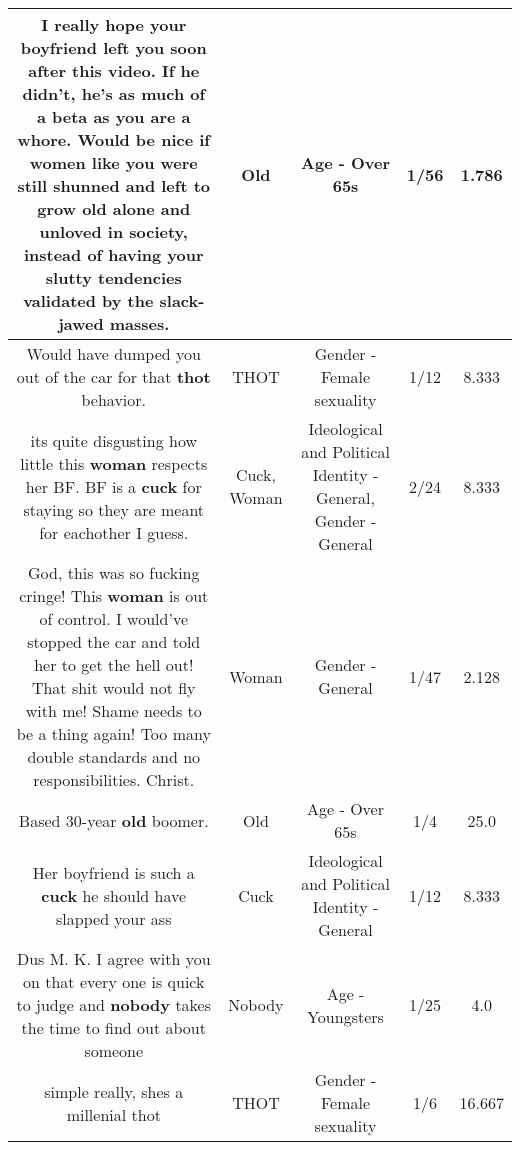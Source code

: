 \documentclass[11pt]{article}
\newlength\mylength
\begin{document}
\begin{center}
\begin{longtable}{|C{.65\mylength}|C{.30\mylength}|C{.12\mylength}|C{.12\mylength}|C{.12\mylength}|}
  \small I really hope your boyfriend left you soon after this video.  If he didn't, he's as much of a beta as you are a whore.  Would be nice if women like you were still shunned and left to grow \textbf{old} alone and unloved in society, instead of having your slutty tendencies validated by the slack-jawed masses.\normalsize   & Old & Age - Over 65s & 1/56 & 1.786 \\  \hline
  \small Would have dumped you out of the car for that \textbf{thot} behavior.\normalsize   & THOT & Gender - Female sexuality & 1/12 & 8.333 \\  \hline
  \small its quite disgusting how little this \textbf{woman} respects her BF. BF is a \textbf{cuck} for staying so they are meant for eachother I guess.\normalsize   & Cuck, Woman &  Ideological and Political Identity - General, Gender - General & 2/24 & 8.333 \\  \hline
  \small God, this was so fucking cringe! This \textbf{woman} is out of control. I would've stopped the car and told her to get the hell out! That shit would not fly with me! Shame needs to be a thing again! Too many double standards and no responsibilities. Christ.\normalsize   & Woman & Gender - General & 1/47 & 2.128 \\  \hline
  \small Based 30-year \textbf{old} boomer.\normalsize   & Old & Age - Over 65s & 1/4 & 25.0 \\  \hline
  \small Her boyfriend is such a \textbf{cuck} he should have slapped your ass\normalsize   & Cuck &  Ideological and Political Identity - General & 1/12 & 8.333 \\  \hline
  \small Dus M. K. I agree with you on that every one is quick to judge and \textbf{nobody} takes the time to find out about someone\normalsize   & Nobody & Age - Youngsters & 1/25 & 4.0 \\  \hline
  \small simple really, shes a millenial thot\normalsize   & THOT & Gender - Female sexuality & 1/6 & 16.667 \\  \hline

\end{longtable}
\end{center}
\end{document}
